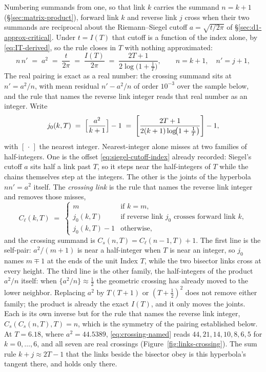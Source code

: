 \documentclass[11pt]{article}
\theoremstyle{definition}
\begin{document}
Numbering summands from one, so that link $k$
carries the summand $n=k+1$ (\S\ref{sec:matrix-product}), forward link $k$ and
reverse link $j$ cross when their two summands are reciprocal about the
Riemann--Siegel cutoff $a=\sqrt{t/2\pi}$ of \S\ref{sec:d1-approx-critical}.
Under $t=I(T)$ that cutoff is a function of the index alone, by
\eqref{eq:IT-derived}, so the rule closes in $T$ with nothing approximated:
\begin{equation}\label{eq:crossing-product}
n\,n'\;=\;a^{2}\;=\;\frac{t}{2\pi}\;=\;\frac{I(T)}{2\pi}
\;=\;\frac{2T+1}{2\log\!\bigl(1+\tfrac1T\bigr)},
\qquad n=k+1,\quad n'=j+1,
\end{equation}
The real pairing is exact as a real number: the crossing summand sits at
$n'=a^{2}/n$, with mean residual $n'-a^{2}/n$ of order $10^{-3}$ over the sample
below, and the rule that names the reverse link integer reads that real number
as an integer. Write
\begin{equation}\label{eq:crossing-named}
j_0(k,T)\;=\;\Bigl[\frac{a^{2}}{k+1}\Bigr]-1
\;=\;\left[\frac{2T+1}{2(k+1)\log\!\bigl(1+\tfrac1T\bigr)}\right]-1,
\end{equation}
with $[\,\cdot\,]$ the nearest integer. Nearest-integer alone misses at two
families of half-integers. One is the offset
\eqref{eq:siegel-cutoff-index} already recorded: Siegel's cutoff $a$ sits
half a link past $T$, so it steps near the half-integers of $T$ while the
chains themselves step at the integers. The other is the joints of the
hyperbola $nn'=a^{2}$ itself. The \emph{crossing link} is the
rule that names the reverse link integer and removes those misses,
\begin{equation}\label{eq:crossing-rule}
C_{\ell}(k,T)\;=\;
\begin{cases}
m & \text{if }k=m,\\[2pt]
j_0(k,T) & \text{if reverse link }j_0\text{ crosses forward link }k,\\[2pt]
j_0(k,T)-1 & \text{otherwise,}
\end{cases}
\end{equation}
and the crossing summand is $C_{s}(n,T)=C_{\ell}(n-1,T)+1$. The first line
is the self-pair: $a^{2}/(m+1)$ is near a half-integer when $T$ is near an
integer, so $j_0$ names $m\mp1$ at the ends of the unit Index $T$, while the
two bisector links cross at every height. The third line
is the other family, the half-integers of the product $a^{2}/n$ itself:
when $\{a^{2}/n\}\approx\tfrac12$ the geometric crossing has already moved
to the lower neighbor. Replacing $a^{2}$ by $T(T+1)$ or $(T+\tfrac12)^{2}$
does not remove either family; the product is already the exact $I(T)$,
and it only moves the joints. Each is its own inverse but for the
rule that names the reverse link integer,
$C_{s}(C_{s}(n,T),T)=n$, which is the symmetry of the pairing established
below. At $T=6.18$, where $a^{2}=44.5389$, \eqref{eq:crossing-named} reads
$44,21,14,10,8,6,5$ for $k=0,\dots,6$, and all seven are real crossings
(Figure~\ref{fig:links-crossing}). The sum rule $k+j\approx2T-1$ that the
links beside the bisector obey is this hyperbola's tangent there, and holds
only there.
\end{document}
